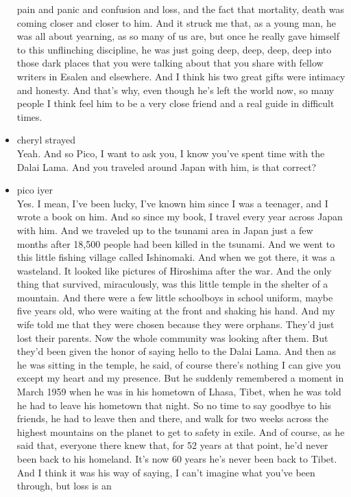 \begin{itemize}
  pain and panic and confusion and loss, and the fact that mortality,
  death was coming closer and closer to him. And it struck me that, as a
  young man, he was all about yearning, as so many of us are, but once
  he really gave himself to this unflinching discipline, he was just
  going deep, deep, deep, deep into those dark places that you were
  talking about that you share with fellow writers in Esalen and
  elsewhere. And I think his two great gifts were intimacy and honesty.
  And that's why, even though he's left the world now, so many people I
  think feel him to be a very close friend and a real guide in difficult
  times.
\item
  cheryl strayed\\
  Yeah. And so Pico, I want to ask you, I know you've spent time with
  the Dalai Lama. And you traveled around Japan with him, is that
  correct?
\item
  pico iyer\\
  Yes. I mean, I've been lucky, I've known him since I was a teenager,
  and I wrote a book on him. And so since my book, I travel every year
  across Japan with him. And we traveled up to the tsunami area in Japan
  just a few months after 18,500 people had been killed in the tsunami.
  And we went to this little fishing village called Ishinomaki. And when
  we got there, it was a wasteland. It looked like pictures of Hiroshima
  after the war. And the only thing that survived, miraculously, was
  this little temple in the shelter of a mountain. And there were a few
  little schoolboys in school uniform, maybe five years old, who were
  waiting at the front and shaking his hand. And my wife told me that
  they were chosen because they were orphans. They'd just lost their
  parents. Now the whole community was looking after them. But they'd
  been given the honor of saying hello to the Dalai Lama. And then as he
  was sitting in the temple, he said, of course there's nothing I can
  give you except my heart and my presence. But he suddenly remembered a
  moment in March 1959 when he was in his hometown of Lhasa, Tibet, when
  he was told he had to leave his hometown that night. So no time to say
  goodbye to his friends, he had to leave then and there, and walk for
  two weeks across the highest mountains on the planet to get to safety
  in exile. And of course, as he said that, everyone there knew that,
  for 52 years at that point, he'd never been back to his homeland. It's
  now 60 years he's never been back to Tibet. And I think it was his way
  of saying, I can't imagine what you've been through, but loss is an

\end{itemize}
